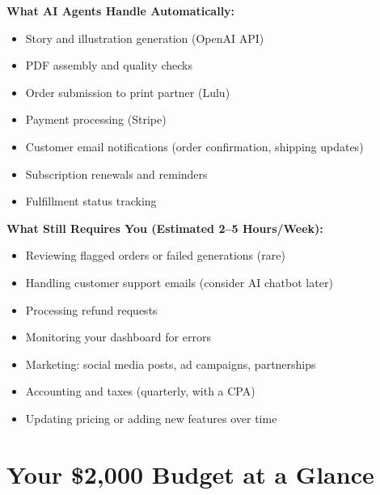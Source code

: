 \documentclass[12pt, letterpaper, oneside]{book}
\begin{document}
\begin{successbox}
\textbf{What AI Agents Handle Automatically:}
\begin{itemize}[leftmargin=1.5em, itemsep=2pt]
  \item Story and illustration generation (OpenAI API)
  \item PDF assembly and quality checks
  \item Order submission to print partner (Lulu)
  \item Payment processing (Stripe)
  \item Customer email notifications (order confirmation, shipping updates)
  \item Subscription renewals and reminders
  \item Fulfillment status tracking
\end{itemize}
\end{successbox}

\begin{warningbox}
\textbf{What Still Requires You (Estimated 2--5 Hours/Week):}
\begin{itemize}[leftmargin=1.5em, itemsep=2pt]
  \item Reviewing flagged orders or failed generations (rare)
  \item Handling customer support emails (consider AI chatbot later)
  \item Processing refund requests
  \item Monitoring your dashboard for errors
  \item Marketing: social media posts, ad campaigns, partnerships
  \item Accounting and taxes (quarterly, with a CPA)
  \item Updating pricing or adding new features over time
\end{itemize}
\end{warningbox}

\section*{Your \$2{,}000 Budget at a Glance}
\end{document}
